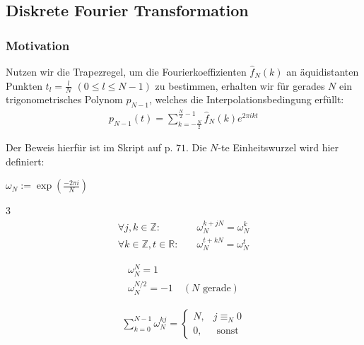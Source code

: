 \newsection
\subsection{Diskrete Fourier Transformation}



\subsubsection{Motivation}

Nutzen wir die Trapezregel, um die Fourierkoeffizienten $\hat{f}_N(k)$ an äquidistanten Punkten $t_l=\frac{l}{N}$ $(0 \leq l \leq N-1)$ zu bestimmen, erhalten wir für gerades $N$ ein trigonometrisches Polynom $p_{N-1}$, welches die Interpolationsbedingung erfüllt:
\begin{align*}
    p_{N-1}(t) = \sum_{k=-\frac{N}{2}}^{\frac{N}{2}-1} \hat{f}_N(k)e^{2\pi ikt}
\end{align*}

Der Beweis hierfür ist im Skript auf p. $71$. Die $N$-te Einheitswurzel wird hier definiert:

 $\omega_N := \exp(\frac{-2\pi i}{N})$

\vspace{-1.5pc}
\begin{multicols}{3}
\begin{align*}
    \forall j,k \in \mathbb{Z}:\quad                 & \omega_N^{k+jN}=\omega_N^k \\
    \forall k \in \mathbb{Z}, t \in \mathbb{R}:\quad & \omega_N^{t+kN}=\omega_N^t 
\end{align*}

\newcolumn
\begin{align*}
    \omega_N^N=1 \\
    \omega_N^{N/2}=-1 \quad (N\text{ gerade})
\end{align*}

\newcolumn
\begin{align*}
    \sum_{k=0}^{N-1} \omega_N^{kj} = \begin{cases}
        N, & j \equiv_N 0 \\
        0, & \text{ sonst}
    \end{cases}
\end{align*}
\newcolumn
\end{multicols}
\vspace{-1.5pc}
